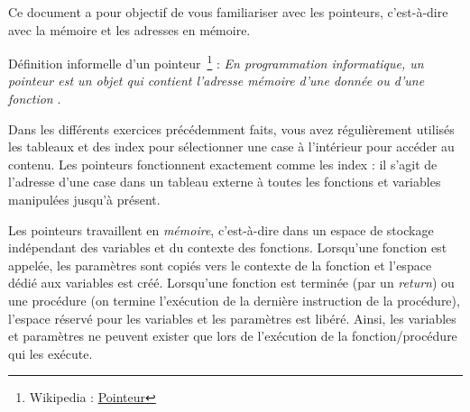 \documentclass[11pt,a4paper]{article}
\begin{document}
\EncadreTitre

\bigskip


%
%

\bigskip


Ce document a pour objectif de vous familiariser avec les pointeurs, c'est-à-dire avec la mémoire et les adresses en mémoire.

\medskip

Définition informelle d'un pointeur~\footnote{Wikipedia : \href{https://fr.wikipedia.org/wiki/Pointeur_(programmation)}{Pointeur}} : \og \textit{En programmation informatique, un pointeur est un objet qui contient l'adresse mémoire d'une donnée ou d'une fonction} \fg .

\medskip

Dans les différents exercices précédemment faits, vous avez régulièrement utilisés les tableaux et des index pour sélectionner une case à l'intérieur pour accéder au contenu.
Les pointeurs fonctionnent exactement comme les index : il s'agit de l'adresse d'une case dans un tableau externe à toutes les fonctions et variables manipulées jusqu'à présent.

\smallskip

Les pointeurs travaillent en \textit{mémoire}, c'est-à-dire dans un espace de stockage indépendant des variables et du contexte des fonctions.
Lorsqu'une fonction est appelée, les paramètres sont copiés vers le contexte de la fonction et l'espace dédié aux variables est créé.
Lorsqu'une fonction est terminée (par un \textit{return}) ou une procédure (on termine l'exécution de la dernière instruction de la procédure), l'espace réservé pour les variables et les paramètres est libéré.
Ainsi, les variables et paramètres ne peuvent exister que lors de l'exécution de la fonction/procédure qui les exécute.
\end{document}
